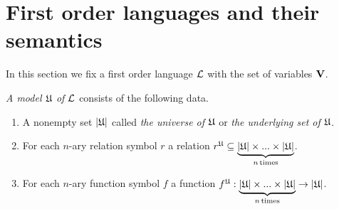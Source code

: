 \section{First order languages and their semantics}
\noindent
In this section we fix a first order language ${\mathcal L}$ with the set of variables $\mathbf{V}$.

\begin{definition}
\textit{A model ${\mathfrak U}$ of ${\mathcal L}$} consists of the following data.
\begin{enumerate}[label=\textbf{(\arabic*)}, leftmargin=3.0em]
\item A nonempty set $|{\mathfrak U}|$ called \textit{the universe of ${\mathfrak U}$} or \textit{the underlying set of ${\mathfrak U}$}.
\item For each $n$-ary relation symbol $r$ a relation $r^{\mathfrak U} \subseteq \underbrace{|{\mathfrak U}| \times ... \times |{\mathfrak U}|}_{n\,\mathrm{times}}$.
\item For each $n$-ary function symbol $f$ a function $f^{\mathfrak U}:\underbrace{|{\mathfrak U}| \times ... \times |{\mathfrak U}|}_{n\,\mathrm{times}} \rightarrow |{\mathfrak U}|$.
\end{enumerate}
\end{definition}
  
